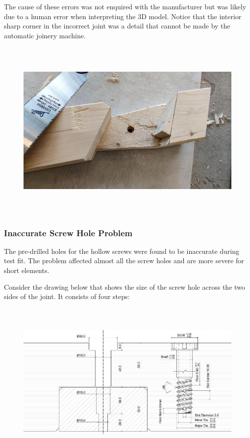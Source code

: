 \documentclass[11pt]{book}
\begin{document}
The cause of these errors was not enquired with the manufacturer but was likely due to a human error when interpreting the 3D model. Notice that the interior sharp corner in the incorrect joint was a detail that cannot be made by the automatic joinery machine. 

\begin{figure}[H]
\includegraphics[width=15.92cm,height=8.96cm]{./images/image83.jpeg}
\end{figure}


\subsubsection{Inaccurate Screw Hole Problem}

The pre-drilled holes for the hollow screws were found to be inaccurate during test fit. The problem affected almost all the screw holes and are more severe for short elements.

Consider the drawing below that shows the size of the screw hole across the two sides of the joint. It consists of four steps:

\begin{figure}[H]
\includegraphics[width=15.92cm,height=7.97cm]{./images/image84.jpeg}
\end{figure}
\end{document}
